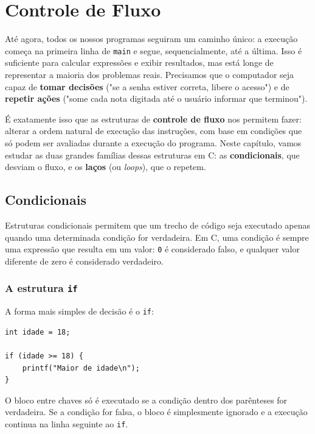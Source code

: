 \documentclass[12pt,a4paper,oneside]{extreport}
\begin{document}

\chapter{Controle de Fluxo}

Até agora, todos os nossos programas seguiram um caminho único: a execução começa na primeira linha de \texttt{main} e segue, sequencialmente, até a última. Isso é suficiente para calcular expressões e exibir resultados, mas está longe de representar a maioria dos problemas reais. Precisamos que o computador seja capaz de \textbf{tomar decisões} ("se a senha estiver correta, libere o acesso") e de \textbf{repetir ações} ("some cada nota digitada até o usuário informar que terminou").

É exatamente isso que as estruturas de \textbf{controle de fluxo} nos permitem fazer: alterar a ordem natural de execução das instruções, com base em condições que só podem ser avaliadas durante a execução do programa. Neste capítulo, vamos estudar as duas grandes famílias dessas estruturas em C: as \textbf{condicionais}, que desviam o fluxo, e os \textbf{laços} (ou \textit{loops}), que o repetem.

\section{Condicionais}

Estruturas condicionais permitem que um trecho de código seja executado apenas quando uma determinada condição for verdadeira. Em C, uma condição é sempre uma expressão que resulta em um valor: \texttt{0} é considerado falso, e qualquer valor diferente de zero é considerado verdadeiro.

\subsection{A estrutura \texttt{if}}

A forma mais simples de decisão é o \texttt{if}:

\begin{lstlisting}
int idade = 18;

if (idade >= 18) {
    printf("Maior de idade\n");
}
\end{lstlisting}

O bloco entre chaves só é executado se a condição dentro dos parênteses for verdadeira. Se a condição for falsa, o bloco é simplesmente ignorado e a execução continua na linha seguinte ao \texttt{if}.
\end{document}
